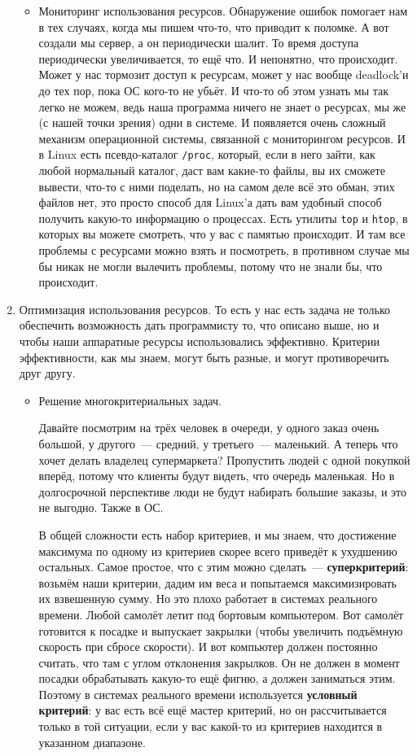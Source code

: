 \documentclass{article}
\begin{document}
\begin{enumerate}
\begin{itemize}
            \item Мониторинг использования ресурсов. Обнаружение ошибок помогает нам в тех случаях, когда мы пишем что-то, что приводит к поломке. А вот создали мы сервер, а он периодически шалит. То время доступа периодически увеличивается, то ещё что. И непонятно, что происходит. Может у нас тормозит доступ к ресурсам, может у нас вообще deadlock'и до тех пор, пока ОС кого-то не убьёт. И что-то об этом узнать мы так легко не можем, ведь наша программа ничего не знает о ресурсах, мы же (с нашей точки зрения) одни в системе. И появляется очень сложный механизм операционной системы, связанной с мониторингом ресурсов. И в Linux есть псевдо-каталог \texttt{/proc}, который, если в него зайти, как любой нормальный каталог, даст вам какие-то файлы, вы их сможете вывести, что-то с ними поделать, но на самом деле всё это обман, этих файлов нет, это просто способ для Linux'а дать вам удобный способ получить какую-то информацию о процессах. Есть утилиты \texttt{top} и \texttt{htop}, в которых вы можете смотреть, что у вас с памятью происходит. И там все проблемы с ресурсами можно взять и посмотреть, в противном случае мы бы никак не могли вылечить проблемы, потому что не знали бы, что происходит.
        \end{itemize}
        \item Оптимизация использования ресурсов. То есть у нас есть задача не только обеспечить возможность дать программисту то, что описано выше, но и чтобы наши аппаратные ресурсы использовались эффективно. Критерии эффективности, как мы знаем, могут быть разные, и могут противоречить друг другу.
        \begin{itemize}
            \item Решение многокритериальных задач.
            
            Давайте посмотрим на трёх человек в очереди, у одного заказ очень большой, у другого~--- средний, у третьего~--- маленький. А теперь что хочет делать владелец супермаркета? Пропустить людей с одной покупкой вперёд, потому что клиенты будут видеть, что очередь маленькая. Но в долгосрочной перспективе люди не будут набирать большие заказы, и это не выгодно. Также в ОС.
            
            В общей сложности есть набор критериев, и мы знаем, что достижение максимума по одному из критериев скорее всего приведёт к ухудшению остальных. Самое простое, что с этим можно сделать~--- \textbf{суперкритерий}: возьмём наши критерии, дадим им веса и попытаемся максимизировать их взвешенную сумму. Но это плохо работает в системах реального времени. Любой самолёт летит под бортовым компьютером. Вот самолёт готовится к посадке и выпускает закрылки (чтобы увеличить подъёмную скорость при сбросе скорости). И вот компьютер должен постоянно считать, что там с углом отклонения закрылков. Он не должен в момент посадки обрабатывать какую-то ещё фигню, а должен заниматься этим. Поэтому в системах реального времени используется \textbf{условный критерий}: у вас есть всё ещё мастер критерий, но он рассчитывается только в той ситуации, если у вас какой-то из критериев находится в указанном диапазоне.
            

\end{itemize}
\end{enumerate}
\end{document}
